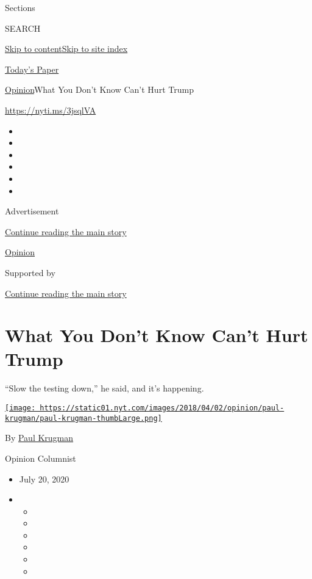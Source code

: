 Sections

SEARCH

\protect\hyperlink{site-content}{Skip to
content}\protect\hyperlink{site-index}{Skip to site index}

\href{https://myaccount.nytimes.com/auth/login?response_type=cookie\&client_id=vi}{}

\href{https://www.nytimes.com/section/todayspaper}{Today's Paper}

\href{/section/opinion}{Opinion}\textbar{}What You Don't Know Can't Hurt
Trump

\href{https://nyti.ms/3jsqlVA}{https://nyti.ms/3jsqlVA}

\begin{itemize}
\item
\item
\item
\item
\item
\item
\end{itemize}

Advertisement

\protect\hyperlink{after-top}{Continue reading the main story}

\href{/section/opinion}{Opinion}

Supported by

\protect\hyperlink{after-sponsor}{Continue reading the main story}

\hypertarget{what-you-dont-know-cant-hurt-trump}{%
\section{What You Don't Know Can't Hurt
Trump}\label{what-you-dont-know-cant-hurt-trump}}

``Slow the testing down,'' he said, and it's happening.

\href{https://www.nytimes.com/by/paul-krugman}{\texttt{[image: https://static01.nyt.com/images/2018/04/02/opinion/paul-krugman/paul-krugman-thumbLarge.png]}}

By \href{https://www.nytimes.com/by/paul-krugman}{Paul Krugman}

Opinion Columnist

\begin{itemize}
\item
  July 20, 2020
\item
  \begin{itemize}
  \item
  \item
  \item
  \item
  \item
  \item
  \end{itemize}
\end{itemize}

